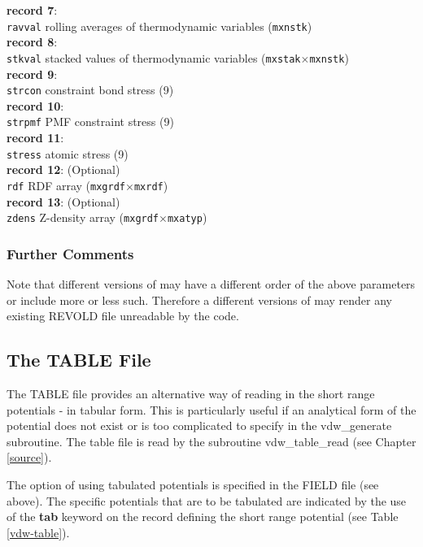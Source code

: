 \begin{tabbing}
{\bf record 7}: \\
\> {\tt ravval} \>  rolling averages of thermodynamic variables ({\tt mxnstk}) \\
{\bf record 8}: \\
\> {\tt stkval} \>  stacked values of thermodynamic variables ({\tt mxstak}$\times${\tt mxnstk}) \\
{\bf record 9}: \\
\> {\tt strcon} \>  constraint bond stress (9) \\
{\bf record 10}: \\
\> {\tt strpmf} \>  PMF constraint stress (9) \\
{\bf record 11}: \\
\> {\tt stress} \>  atomic stress (9) \\
{\bf record 12}: (Optional) \\
\> {\tt rdf}    \> RDF array ({\tt mxgrdf}$\times${\tt mxrdf}) \\
{\bf record 13}: (Optional) \\
\> {\tt zdens}  \> Z-density array ({\tt mxgrdf}$\times${\tt mxatyp})
\end{tabbing}

\subsubsection{Further Comments}

Note that different versions of \D may have a different order of
the above parameters or include more or less such.  Therefore a
different versions of \D may render any existing REVOLD file
unreadable by the code.

\subsection{The TABLE File}
\label{table-file}

The TABLE file provides an alternative way of reading in the short
range potentials - in tabular form.  This is particularly useful if
an analytical form of the potential does not exist or is too
complicated to specify in the {\sc vdw\_generate} subroutine. The
table file is read by the subroutine {\sc vdw\_table\_read} (see Chapter
\ref{source}).

The option of using tabulated
potentials is specified in the FIELD file (see above).  The
specific potentials that are to be tabulated are indicated by the
use of the {\bf tab} keyword on the record defining the short
range potential (see Table \ref{vdw-table}).

